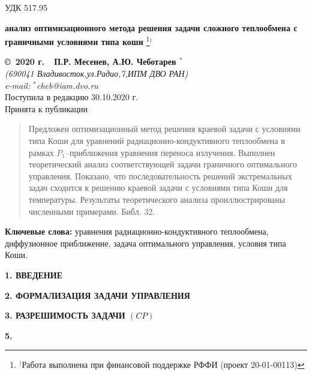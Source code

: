 \documentclass[12pt]{article}
\begin{document}
    УДК 517.95
    \begin{center}
    {\bf анализ оптимизационного метода решения задачи сложного теплообмена с граничными условиями типа коши}
        \footnote[{1}]{$^)$Работа выполнена при финансовой поддержке РФФИ (проект 20-01-00113)}$^)$
    \end{center}
    \begin{center}
    {\bf \copyright\  2020 г.\ \  П.Р. Месенев, А.Ю. Чеботарев $^{*}$}
        \\
        {\it (690041 Владивосток,ул.Радио,7,ИПМ ДВО РАН)\\
        e-mail:  $^{*}$cheb@iam.dvo.ru}\\
        {\small  Поступила в редакцию 30.10.2020 г.\\
        Принята к публикации }
    \end{center}

    \sloppy
    \begin{quote}
        \small
        Предложен оптимизационный метод решения краевой задачи с условиями типа Коши
        для уравнений радиационно-кондуктивного теплообмена в рамках $P_1$--приближения
        уравнения переноса излучения. Выполнен теоретический анализ соответствующей задачи
        граничного оптимального управления.
        Показано, что последовательность решений экстремальных задач
        сходится к решению краевой задачи с условиями типа Коши для температуры.
        Результаты теоретического анализа проиллюстрированы численными примерами.
        Библ.
        32.
    \end{quote}
    {\bf Ключевые слова:} уравнения радиационно-кондуктивного теплообмена, диффузионное
    приближение, задача оптимального управления, условия типа Коши.

    \begin{center}
        \textbf{1. ВВЕДЕНИЕ}
    \end{center}

    \begin{center}
        \textbf{2. ФОРМАЛИЗАЦИЯ ЗАДАЧИ УПРАВЛЕНИЯ}
    \end{center}

    \begin{center}
        \textbf{3. РАЗРЕШИМОСТЬ ЗАДАЧИ $(CP)$}
    \end{center}




    \begin{center}
        \textbf{5. }
    \end{center}
\end{document}
